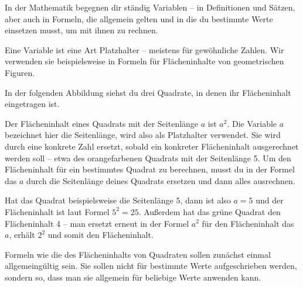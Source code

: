 \documentclass[../../main.tex]{subfiles}
\begin{document}
In der Mathematik begegnen dir ständig Variablen -- in Definitionen und Sätzen, aber auch in Formeln, die allgemein gelten und in die du bestimmte Werte einsetzen musst, um mit ihnen zu rechnen.

Eine Variable ist eine Art Platzhalter -- meistens für gewöhnliche Zahlen. Wir verwenden sie beispielsweise in Formeln für Flächeninhalte von geometrischen Figuren. 

\begin{example}
    In der folgenden Abbildung siehst du drei Quadrate, in denen ihr Flächeninhalt eingetragen ist.
    
        
    Der Flächeninhalt eines Quadrats mit der Seitenlänge $a$ ist $a^2$. Die Variable $a$ bezeichnet hier die Seitenlänge, wird also als Platzhalter verwendet. Sie wird durch eine konkrete Zahl ersetzt, sobald ein konkreter Flächeninhalt ausgerechnet werden soll -- etwa des orangefarbenen Quadrats mit der Seitenlänge 5. Um den Flächeninhalt für ein bestimmtes Quadrat zu berechnen, musst du in der Formel das $a$ durch die Seitenlänge deines Quadrats ersetzen und dann alles ausrechnen.
    
    Hat das Quadrat beispielsweise die Seitenlänge $5$, dann ist also $a=5$ und der Flächeninhalt ist laut Formel $5^2=25$. Außerdem hat das grüne Quadrat den Flächeninhalt 4 -- man ersetzt erneut in der Formel $a^2$ für den Flächeninhalt das $a$, erhält $2^2$ und somit den Flächeninhalt.
\end{example}

Formeln wie die des Flächeninhalts von Quadraten sollen zunächst einmal allgemeingültig sein. Sie sollen nicht für bestimmte Werte aufgeschrieben werden, sondern so, dass man sie allgemein für beliebige Werte anwenden kann.
\end{document}

